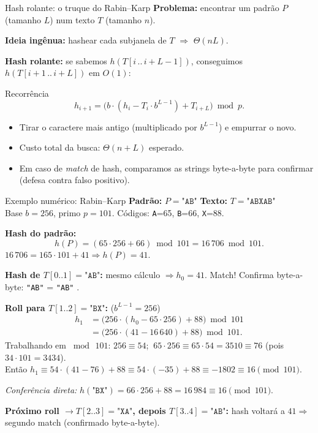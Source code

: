 \documentclass[aspectratio=169]{beamer}
\begin{document}
\begin{frame}{Hash rolante: o truque do Rabin--Karp}
\textbf{Problema:} encontrar um padrão $P$ (tamanho $L$) num texto $T$ (tamanho $n$).

\smallskip
\textbf{Ideia ingênua:} hashear cada subjanela de $T$ $\Rightarrow$ $\Theta(nL)$.

\smallskip
\textbf{Hash rolante:} se sabemos $h(T[i\,..\,i{+}L{-}1])$, conseguimos $h(T[i{+}1\,..\,i{+}L])$ em $O(1)$:
\begin{block}{Recorrência}
$$h_{i+1} = \big(b \cdot (h_i - T_i \cdot b^{L-1}) + T_{i+L}\big) \bmod p.$$
\end{block}
\begin{itemize}
\item Tirar o caractere mais antigo (multiplicado por $b^{L-1}$) e empurrar o novo.
\item Custo total da busca: $\Theta(n + L)$ esperado.
\item Em caso de \emph{match} de hash, comparamos as strings byte-a-byte para confirmar (defesa contra falso positivo).
\end{itemize}
\end{frame}

\begin{frame}[shrink=15]{Exemplo numérico: Rabin--Karp}
\textbf{Padrão:} $P = \texttt{"AB"}$ \quad \textbf{Texto:} $T = \texttt{"ABXAB"}$\\
Base $b = 256$, primo $p = 101$. Códigos: \texttt{A}=65, \texttt{B}=66, \texttt{X}=88.

\smallskip
\textbf{Hash do padrão:}
$$h(P) = (65 \cdot 256 + 66) \bmod 101 = 16\,706 \bmod 101.$$
$16\,706 = 165\cdot 101 + 41 \Rightarrow h(P) = 41.$

\smallskip
\textbf{Hash de $T[0..1] = \texttt{"AB"}$:} mesmo cálculo $\Rightarrow h_0 = 41$. \alert{Match!} Confirma byte-a-byte: \texttt{"AB"} = \texttt{"AB"} \checkmark.

\smallskip
\textbf{Roll para $T[1..2] = \texttt{"BX"}$:} ($b^{L-1} = 256$)
\begin{align*}
h_1 &= \big(256 \cdot (h_0 - 65 \cdot 256) + 88\big) \bmod 101 \\
    &= \big(256 \cdot (41 - 16\,640) + 88\big) \bmod 101.
\end{align*}
Trabalhando em $\bmod\, 101$: $256 \equiv 54$; $\ 65 \cdot 256 \equiv 65 \cdot 54 = 3510 \equiv 76$ (pois $34\cdot 101 = 3434$).\\
Então $h_1 \equiv 54 \cdot (41 - 76) + 88 \equiv 54 \cdot (-35) + 88 \equiv -1802 \equiv 16 \pmod{101}$.

\smallskip
\textit{Conferência direta:} $h(\texttt{"BX"}) = 66 \cdot 256 + 88 = 16\,984 \equiv 16 \pmod{101}$. \checkmark

\smallskip
\textbf{Próximo roll $\to T[2..3]=\texttt{"XA"}$, depois $T[3..4]=\texttt{"AB"}$:} hash voltará a $41 \Rightarrow$ segundo match (confirmado byte-a-byte).
\end{frame}
\end{document}
